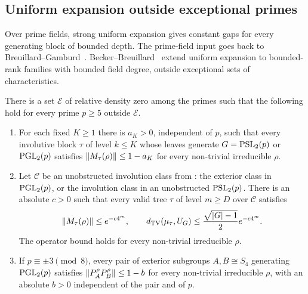 \subsection{Uniform expansion outside exceptional primes}

Over prime fields, strong uniform expansion gives constant gaps for every
generating block of bounded depth. The prime-field input goes back to
Breuillard--Gamburd~\cite[Corollary 1.1]{BreuillardGamburd2010}.
Becker--Breuillard~\cite[Theorem 1.1 and Corollary 3.2]{BeckerBreuillard2026}
extend uniform expansion to bounded-rank families with bounded field degree,
outside exceptional sets of characteristics.

\begin{corollary}
\label{cor:almost-all-primes}
There is a set $\mathcal E$ of relative density zero among the primes
such that the following hold for every prime $p\ge5$ outside $\mathcal E$.
\begin{enumerate}[nosep,leftmargin=1.6em]
\item For each fixed $K\ge1$ there is $a_K>0$, independent of $p$, such that
every involutive block $\tau$ of level $k\le K$ whose leaves generate
$G=\operatorname{PSL}_2(p)$ or $\operatorname{PGL}_2(p)$ satisfies
$\lVert M_\tau(\rho) \rVert\le1-a_K$ for every non-trivial irreducible $\rho$.
\item Let $\mathcal C$ be an unobstructed involution class from
: the exterior class in $\operatorname{PGL}_2(p)$,
or the involution class in an unobstructed $\operatorname{PSL}_2(p)$.
There is an absolute $c>0$ such that every valid tree $\tau$ of level $m\ge D$
over $\mathcal C$ satisfies
\begin{equation}\label{eq:almost-all-prime-rate}
 \lVert M_\tau(\rho) \rVert\le e^{-c4^m},\qquad
 d_{\mathrm{TV}}(\mu_\tau,U_G)\le\frac{\sqrt{\lvert G \rvert-1}}2 e^{-c4^m}.
\end{equation}
The operator bound holds for every non-trivial irreducible $\rho$.
\item If $p\equiv\pm3\pmod8$, every pair of exterior subgroups
$A,B\cong S_4$ generating $\operatorname{PGL}_2(p)$ satisfies
$\lVert P_A^\rho P_B^\rho \rVert\le1-b$ for every non-trivial irreducible $\rho$,
with an absolute $b>0$ independent of the pair and of $p$.
\end{enumerate}
\end{corollary}
